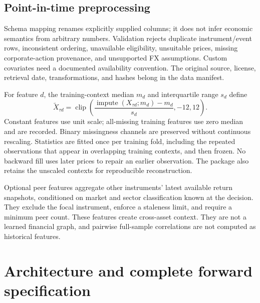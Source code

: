 \documentclass[11pt,a4paper]{article}
\newcommand{\clip}{\operatorname{clip}}
\begin{document}
\subsection{Point-in-time preprocessing}

Schema mapping renames explicitly supplied columns; it does not infer economic semantics from arbitrary numbers. Validation rejects duplicate instrument/event rows, inconsistent ordering, unavailable eligibility, unsuitable prices, missing corporate-action provenance, and unsupported FX assumptions. Custom covariates need a documented availability convention. The original source, license, retrieval date, transformations, and hashes belong in the data manifest.

For feature $d$, the training-context median $m_d$ and interquartile range $s_d$ define
\begin{equation}
\widetilde X_{\tau d}=\clip\!\left(\frac{\operatorname{impute}(X_{\tau d};m_d)-m_d}{s_d},-12,12\right).
\end{equation}
Constant features use unit scale; all-missing training features use zero median and are recorded. Binary missingness channels are preserved without continuous rescaling. Statistics are fitted once per training fold, including the repeated observations that appear in overlapping training contexts, and then frozen. No backward fill uses later prices to repair an earlier observation. The package also retains the unscaled contexts for reproducible reconstruction.

Optional peer features aggregate other instruments' latest available return snapshots, conditioned on market and sector classification known at the decision. They exclude the focal instrument, enforce a staleness limit, and require a minimum peer count. These features create cross-asset context. They are not a learned financial graph, and pairwise full-sample correlations are not computed as historical features.

\section{Architecture and complete forward specification}
\end{document}
